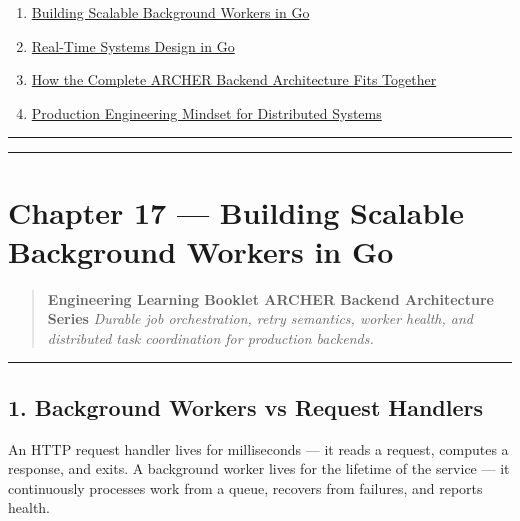 \documentclass[
]{article}
\providecommand{\tightlist}{%
  \setlength{\itemsep}{0pt}\setlength{\parskip}{0pt}}
\begin{document}
\begin{enumerate}
\def\labelenumi{\arabic{enumi}.}
\setcounter{enumi}{16}
\tightlist
\item
  \protect\hyperlink{chapter-17--building-scalable-background-workers-in-go}{Building
  Scalable Background Workers in Go}
\item
  \protect\hyperlink{chapter-18--real-time-systems-design-in-go}{Real-Time
  Systems Design in Go}
\item
  \protect\hyperlink{chapter-19--how-the-complete-archer-backend-architecture-fits-together}{How
  the Complete ARCHER Backend Architecture Fits Together}
\item
  \protect\hyperlink{chapter-20--production-engineering-mindset-for-distributed-systems}{Production
  Engineering Mindset for Distributed Systems}
\end{enumerate}

\begin{center}\rule{0.5\linewidth}{0.5pt}\end{center}

\begin{center}\rule{0.5\linewidth}{0.5pt}\end{center}

\hypertarget{chapter-17-building-scalable-background-workers-in-go}{%
\section{Chapter 17 --- Building Scalable Background Workers in
Go}\label{chapter-17-building-scalable-background-workers-in-go}}

\begin{quote}
\textbf{Engineering Learning Booklet \textbar{} ARCHER Backend
Architecture Series} \emph{Durable job orchestration, retry semantics,
worker health, and distributed task coordination for production
backends.}
\end{quote}

\begin{center}\rule{0.5\linewidth}{0.5pt}\end{center}

\hypertarget{background-workers-vs-request-handlers}{%
\subsection{1. Background Workers vs Request
Handlers}\label{background-workers-vs-request-handlers}}

An HTTP request handler lives for milliseconds --- it reads a request,
computes a response, and exits. A background worker lives for the
lifetime of the service --- it continuously processes work from a queue,
recovers from failures, and reports health.
\end{document}

